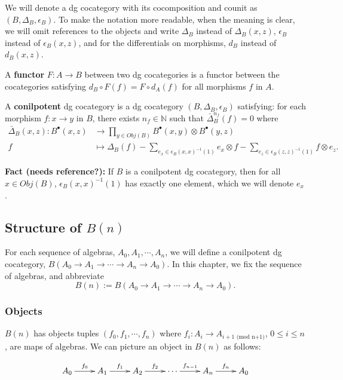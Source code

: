 We will denote a dg cocategory with its 
cocomposition and counit as $(B, \Delta_B, 
\epsilon_B)$. To make the notation more 
readable, when the meaning is clear, 
we will omit references to the 
objects and write $\Delta_B$ instead of 
$\Delta_B(x,z)$, $\epsilon_B$ instead of 
$\epsilon_B(x,z)$, and for the differentials 
on morphisms, $d_B$ instead of $d_B(x,z)$.
%
\begin{defn} A \textbf{functor} $F: A \to B$ 
between two dg cocategories is a functor 
between the cocategories satisfying 
$d_B\circ F(f) = F\circ d_A(f)$ for all 
morphisms $f$ in $A$.
\end{defn}
%
\begin{defn} A \textbf{conilpotent} dg 
cocategory is a dg cocategory $(B, 
\Delta_B, \epsilon_B)$ satisfying: for each 
morphism $f:x\to y$ in $B$, there exists 
$n_f \in \mathbb{N}$ such that 
$\bar{\Delta}_B^{n_f}(f) = 0$
where
\begin{align*}
\bar{\Delta}_B(x,z): B^\bullet(x,z) 
&\to 
  \prod \limits_{y \in Obj(B)} 
  B^\bullet(x,y) \otimes
  B^\bullet(y,z)\\
f
&\mapsto
\Delta_B(f)
- \sum \limits_{e_x \in 
  \epsilon_B(x,x)^{-1}(1)}
  e_x \otimes f
- \sum \limits_{e_z \in 
  \epsilon_B(z,z)^{-1}(1)}
  f \otimes e_z. 
\end{align*}
\end{defn}
%
\textbf{Fact (needs reference?):} 
If $B$ is a conilpotent dg cocategory, 
then for all $x \in Obj(B)$, 
$\epsilon_B(x,x)^{-1}(1)$ has exactly 
one element, which we will denote $e_x$.
%
\subsection{Structure of $B(n)$}
For each sequence of algebras, 
$A_0, A_1, \cdots, A_n$, 
we will define a conilpotent dg cocategory, 
$B(A_0 \to A_1 \to \cdots \to A_n \to A_0)$. 
In this chapter, we fix the sequence of 
algebras, and abbreviate 
$$
B(n):= B(A_0 \to A_1 \to \cdots \to A_n \to A_0).
$$
%
\subsubsection{Objects}
$B(n)$ has objects tuples $(f_0, f_1, \cdots, f_n)$ where $f_i : A_i \to A_{i+1 \textrm{ (mod n+1)}}$, $0 \leq i \leq n$, are maps of algebras. We can picture an object in $B(n)$ as follows:

\begin{equation*}
\xymatrix{
A_0 \ar[r]^{f_0}
& A_1 \ar[r]^{f_1}
& A_2 \ar[r]^{f_2}
& \cdots \ar[r]^{f_{n-1}}
& A_n \ar[r]^{f_n}
& A_0
}
\end{equation*}

